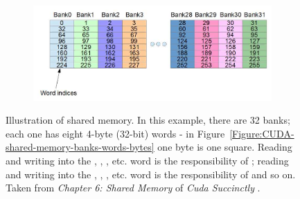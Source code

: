 \begin{figure}[h!]
	\begin{subfigure}{\textwidth}
		\centering
		\hspace*{-0.8cm}
		\includegraphics[width=13cm, keepaspectratio]{images/ch1/CUDA_shared_memory_banks_words_indices.png}
		\label{Figure:CUDA-shared-memory-banks-words-ids}
	\end{subfigure}
	\caption{Illustration of shared memory. In this example, there are 32 banks; each one has eight 4-byte (32-bit) words - in Figure~\ref{Figure:CUDA-shared-memory-banks-words-bytes} one byte is one square. Reading and writing into the , , , etc. word is the responsibility of ; reading and writing into the , , , etc. word is the responsibility of  and so on. Taken from \emph{Chapter 6: Shared Memory} of \emph{Cuda Succinctly} \cite{Rose2017}.}
	\label{Figure:CUDA-shared-memory-banks-words}
\end{figure}

